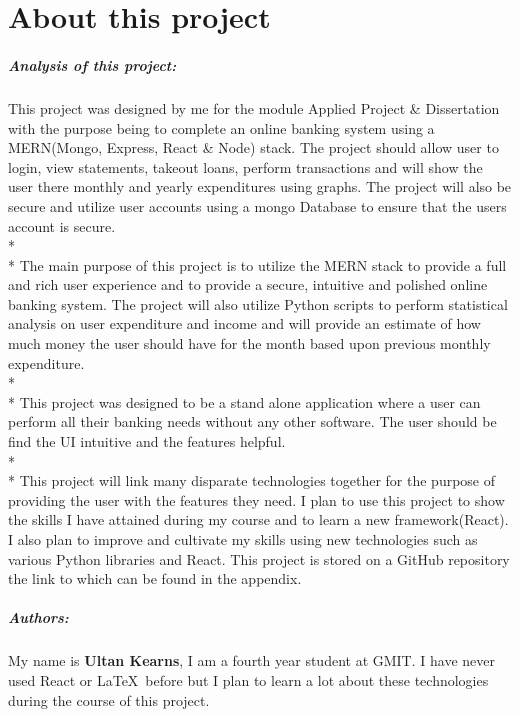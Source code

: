 
\chapter*{About this project}
\paragraph{Analysis of this project: }
This project was designed by me for the module Applied Project \& Dissertation with the purpose being
to complete an online banking system using a MERN(Mongo, Express, React \& Node) stack.
The project should allow user to login, view statements, takeout loans, perform transactions and
will show the user there monthly and yearly expenditures using graphs. The project will also be
secure and utilize user accounts using a mongo Database to ensure that the users account is secure.
\\*
\\*
The main purpose of this project is to utilize the MERN stack to provide a full and rich user
experience and to provide a secure, intuitive and polished online banking system.  The project
will also utilize Python scripts to perform statistical analysis on user expenditure and income
and will provide an estimate of how much money the user should have for the month based upon previous
monthly expenditure.
\\*
\\*
This project was designed to be a stand alone application where a user can perform all their
banking needs without any other software.  The user should be find the UI intuitive and the
features helpful.
\\*
\\*
This project will link many disparate technologies together for the purpose of providing the user
with the features they need.  I plan to use this project to show the skills I have attained during
my course and to learn a new framework(React). I also plan to improve and cultivate my skills
using new technologies such as various Python libraries and React. This project is stored on a GitHub
repository the link to which can be found in the appendix.
\paragraph{Authors: }
My name is \textbf{Ultan Kearns}, I am a fourth year student at GMIT. I have never used
React or \LaTeX\  before but I plan to learn a lot about these technologies during the course of this project.



